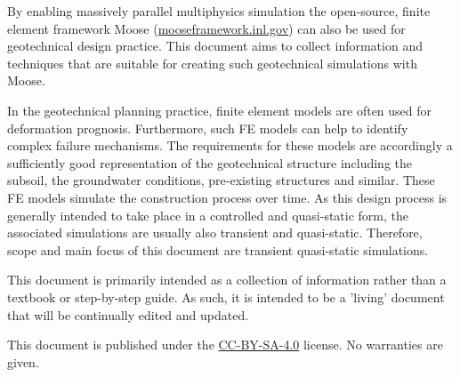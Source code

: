 By enabling massively parallel multiphysics simulation the open-source, finite
element framework Moose
(\href{https://mooseframework.inl.gov}{mooseframework.inl.gov}) can also be
used for geotechnical design practice. This document aims to collect
information and techniques that are suitable for creating such geotechnical
simulations with Moose.

In the geotechnical planning practice, finite element models are often used for
deformation prognosis. Furthermore, such FE models can help to identify complex
failure mechanisms. The requirements for these models are accordingly a
sufficiently good representation of the geotechnical structure including the
subsoil, the groundwater conditions, pre-existing structures and similar. These
FE models simulate the construction process over time. As this design process
is generally intended to take place in a controlled and quasi-static form, the
associated simulations are usually also transient and quasi-static. Therefore,
scope and main focus of this document are transient quasi-static simulations.

This document is primarily intended as a collection of information rather than
a textbook or step-by-step guide. As such, it is intended to be a 'living'
document that will be continually edited and updated.

This document is published under the
\href{https://creativecommons.org/licenses/by-sa/4.0/}{CC-BY-SA-4.0} license.
No warranties are given.